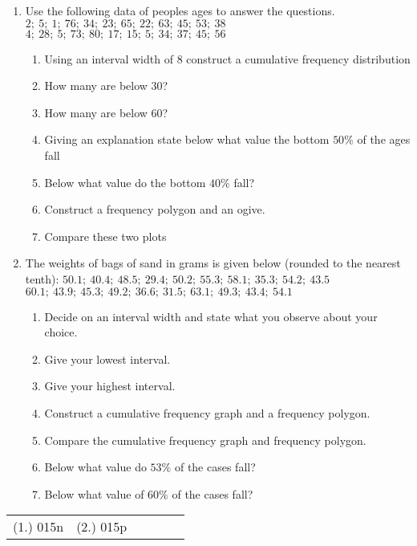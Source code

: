{
\begin{enumerate}
\item Use the following data of peoples ages to answer the questions. \newline
$2;~ 5;~1;~ 76;~ 34;~ 23; ~65; ~22;~ 63;~ 45;~ 53; ~38 $\newline
$4; ~28; ~5; ~73; ~80; ~17; ~15; ~5; ~34; ~37;~ 45; ~56 $
	\begin{enumerate}
	\item Using an interval width of $8$ construct a cumulative frequency distribution 
	\item How many are below $30$?
	\item How many are below $60$?
	\item Giving an explanation state below what value the bottom $50\%$ of the ages fall
	\item Below what value do the bottom $40\%$ fall?
	\item Construct a frequency polygon and an ogive. 
	\item Compare these two plots
	\end{enumerate}
\item The weights of bags of sand in grams is given below (rounded to the nearest tenth): \newline
$50.1;~ 40.4; ~48.5;~ 29.4; ~50.2; ~55.3;~ 58.1;~ 35.3;~ 54.2;~ 43.5$ \newline
$60.1; ~43.9;~ 45.3; ~49.2; ~36.6; ~31.5; ~63.1; ~49.3;~ 43.4; ~54.1$ 
	\begin{enumerate}
	\item Decide on an interval width and state what you observe about your choice.
	\item Give your lowest interval. 
	\item Give your highest interval.
	\item Construct a cumulative frequency graph and a frequency polygon.
	\item Compare the cumulative frequency graph and frequency polygon.
	\item Below what value do $53\%$ of the cases fall?
	\item Below what value of $60\%$ of the cases fall?
	\end{enumerate}
\end{enumerate}


\par \practiceinfo
\par \begin{tabular}[h]{cccccc}
(1.)	015n	&
(2.)	015p	&
\end{tabular}}

